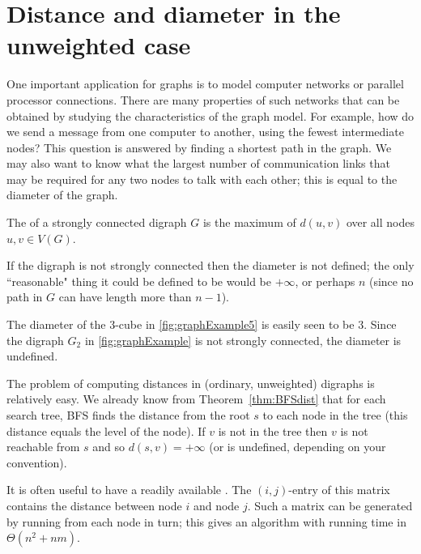 \section{Distance and diameter in the unweighted
case}\label{sec:unweighted}

One important application for graphs is to model computer networks or
parallel processor connections.  There are many properties of such
networks that can be obtained by studying the characteristics of the
graph model. For example, how do we send a message from one computer to
another, using the fewest intermediate nodes? This question is answered
by finding a shortest path in the graph.  We may also want to know what
the largest number of communication links that may be required for any
two nodes to talk with each other; this is equal to the diameter of
the graph.

\begin{Definition}\label{def:diameter}
The  of a strongly connected digraph $G$ is the
maximum of $d(u,v)$ over all nodes $u, v\in V(G)$.
\end{Definition}

\begin{note} If the digraph is not strongly connected then the
diameter is not defined; the only ``reasonable" thing it could be
defined to be would be $+\infty$, or perhaps $n$ (since 
no path in $G$ can have length more than $n-1$).
\end{note}

\begin{Example}
The diameter of the $3$-cube in \cref{fig:graphExample5} is easily
seen to be $3$. Since the digraph $G_2$ in \cref{fig:graphExample}
is not strongly connected, the diameter is undefined.  
\end{Example}

The problem of computing distances in (ordinary, unweighted) digraphs is
relatively easy. We already know from Theorem~\ref{thm:BFSdist} that
for each search tree, BFS finds the distance from the root $s$ to each
node in the tree (this distance equals the level of the node). If $v$
is not in the tree then $v$ is not reachable from $s$ and so $d(s,v) =
+\infty$ (or is undefined,  depending on your convention). 

It is often useful to have a readily available .
The $(i, j)$-entry of this matrix contains the distance between node $i$
and node $j$. Such a matrix can be generated by running 
from each node in turn; this gives an algorithm with running time in
$\Theta(n^2+nm)$.


